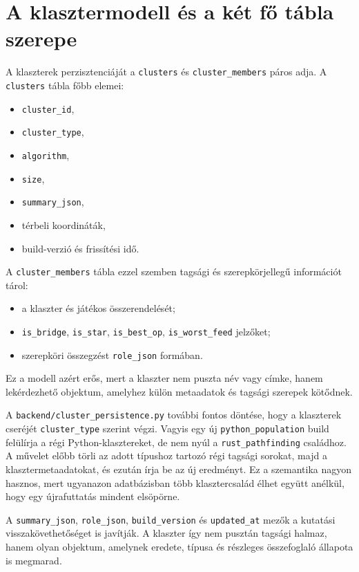\documentclass[a4paper,12pt]{report}
\begin{document}
\section{A klasztermodell és a két fő tábla szerepe}

A klaszterek perzisztenciáját a \texttt{clusters} és \texttt{cluster\_members} páros adja. A \texttt{clusters} tábla főbb elemei:

\begin{itemize}
    \item \texttt{cluster\_id},
    \item \texttt{cluster\_type},
    \item \texttt{algorithm},
    \item \texttt{size},
    \item \texttt{summary\_json},
    \item térbeli koordináták,
    \item build-verzió és frissítési idő.
\end{itemize}

A \texttt{cluster\_members} tábla ezzel szemben tagsági és szerepkörjellegű információt tárol:

\begin{itemize}
    \item a klaszter és játékos összerendelését;
    \item \texttt{is\_bridge}, \texttt{is\_star}, \texttt{is\_best\_op}, \texttt{is\_worst\_feed} jelzőket;
    \item szerepköri összegzést \texttt{role\_json} formában.
\end{itemize}

Ez a modell azért erős, mert a klaszter nem puszta név vagy címke, hanem lekérdezhető objektum, amelyhez külön metaadatok és tagsági szerepek kötődnek.

A \texttt{backend/cluster\_persistence.py} további fontos döntése, hogy a klaszterek cseréjét \texttt{cluster\_type} szerint végzi. Vagyis egy új \texttt{python\_population} build felülírja a régi Python-klasztereket, de nem nyúl a \texttt{rust\_pathfinding} családhoz. A művelet előbb törli az adott típushoz tartozó régi tagsági sorokat, majd a klasztermetaadatokat, és ezután írja be az új eredményt. Ez a szemantika nagyon hasznos, mert ugyanazon adatbázisban több klasztercsalád élhet együtt anélkül, hogy egy újrafuttatás mindent elsöpörne.

A \texttt{summary\_json}, \texttt{role\_json}, \texttt{build\_version} és \texttt{updated\_at} mezők a kutatási visszakövethetőséget is javítják. A klaszter így nem pusztán tagsági halmaz, hanem olyan objektum, amelynek eredete, típusa és részleges összefoglaló állapota is megmarad.
\end{document}

